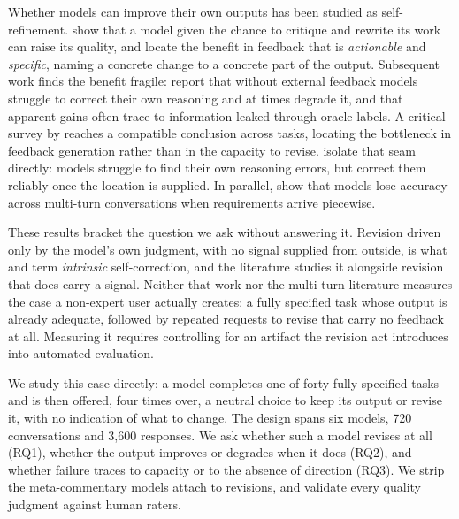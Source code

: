 Whether models can improve their own outputs has been studied as self-refinement.
\citet{madaan2024self} show that a model given the chance to critique and rewrite its work
can raise its quality, and locate the benefit in feedback that is \emph{actionable} and
\emph{specific}, naming a concrete change to a concrete part of the output. Subsequent work finds the benefit fragile: \citet{huang2024large} report that without external feedback
models struggle to correct their own reasoning and at times degrade it, and that apparent
gains often trace to information leaked through oracle labels. A critical survey by
\citet{kamoi2024selfcorrection} reaches a compatible conclusion across tasks, locating the bottleneck in feedback generation rather than in the capacity to revise.
\citet{tyen2024llms} isolate that seam directly: models struggle to find their own
reasoning errors, but correct them reliably once the location is supplied. In parallel,
\citet{laban2025lost} show that models lose accuracy across multi-turn conversations when
requirements arrive piecewise.

These results bracket the question we ask without answering it. Revision driven only by the
model's own judgment, with no signal supplied from outside, is what
\citet{kamoi2024selfcorrection} and \citet{huang2024large} term \emph{intrinsic}
self-correction, and the literature studies it alongside revision that does carry a signal.
Neither that work nor the multi-turn literature measures the case a non-expert user
actually creates: a fully specified task whose output is already adequate, followed by
repeated requests to revise that carry no feedback at all. Measuring it requires
controlling for an artifact the revision act introduces into automated evaluation.

We study this case directly: a model completes one of forty fully specified tasks and is
then offered, four times over, a neutral choice to keep its output or revise it, with no indication of what to change. The design spans six models, 720
conversations and 3,600 responses. We ask whether such a model revises at all (RQ1),
whether the output improves or degrades when it does (RQ2), and whether failure traces to
capacity or to the absence of direction (RQ3).
We strip the meta-commentary models attach to revisions, and validate every quality
judgment against human raters.

